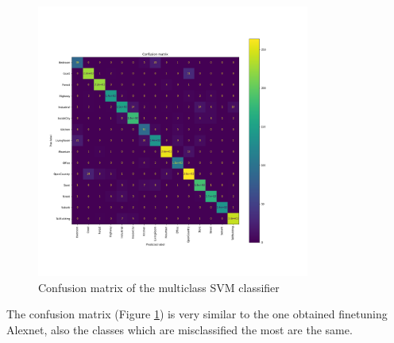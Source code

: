 \documentclass[12pt, a4paper]{report}
\begin{document}
\begin{figure}[h!]
	\centering
	\includegraphics[width=0.8\textwidth]{img/confusion_multiclassSVM}
	\caption{Confusion matrix of the multiclass SVM classifier}	
	\label{fig:svm}
\end{figure}

The confusion matrix (Figure \ref{fig:svm}) is very similar to the one obtained finetuning Alexnet, also the classes which are misclassified the most are the same.
\end{document}
